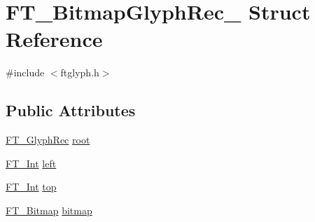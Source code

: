 \hypertarget{struct_f_t___bitmap_glyph_rec__}{\section{F\-T\-\_\-\-Bitmap\-Glyph\-Rec\-\_\- Struct Reference}
\label{struct_f_t___bitmap_glyph_rec__}
}


{\ttfamily \#include $<$ftglyph.\-h$>$}

\subsection*{Public Attributes}
\begin{DoxyCompactItemize}
\item 
\hyperlink{ftglyph_8h_a095b515f46c978b33ffc9c20aad081a4}{F\-T\-\_\-\-Glyph\-Rec} \hyperlink{struct_f_t___bitmap_glyph_rec___ac3970353fbc0fe3d4c59c3fd608140f3}{root}
\item 
\hyperlink{fttypes_8h_af90e5fb0d07e21be9fe6faa33f02484c}{F\-T\-\_\-\-Int} \hyperlink{struct_f_t___bitmap_glyph_rec___a6cfd2d89af7b6be4af886047c9cb7e0a}{left}
\item 
\hyperlink{fttypes_8h_af90e5fb0d07e21be9fe6faa33f02484c}{F\-T\-\_\-\-Int} \hyperlink{struct_f_t___bitmap_glyph_rec___a25fc81296678d6a2d064843c01bc05f7}{top}
\item 
\hyperlink{ftimage_8h_ae28691030f2d16376937cf5e3485f921}{F\-T\-\_\-\-Bitmap} \hyperlink{struct_f_t___bitmap_glyph_rec___a16ecd0725920f8d5ad4c14e9448126ad}{bitmap}
\end{DoxyCompactItemize}


